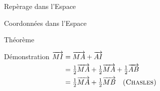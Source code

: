 \documentclass{cours}
\begin{document}
\begin{Gpartie}{Repèrage dans l'Espace}
\begin{Spartie}{Coordonnées dans l'Espace}
\begin{SSpartie}{Théorème}
                \begin{SSSpartie}{Démonstration} 
                    $\begin{aligned}[t]
                        \overrightarrow{MI}&=\overrightarrow{MA}+\overrightarrow{AI} \\
                        &=\tfrac{1}{2}\overrightarrow{MA}+\tfrac{1}{2}\overrightarrow{MA}+\tfrac{1}{2}\overrightarrow{AB} \\
                        &=\tfrac{1}{2}\overrightarrow{MA}+\tfrac{1}{2}\overrightarrow{MB}\quad\textsc{(Chasles)}
                    \end{aligned}$
                \end{SSSpartie}
            \end{SSpartie}
        \end{Spartie}
    \end{Gpartie}
\end{document}

